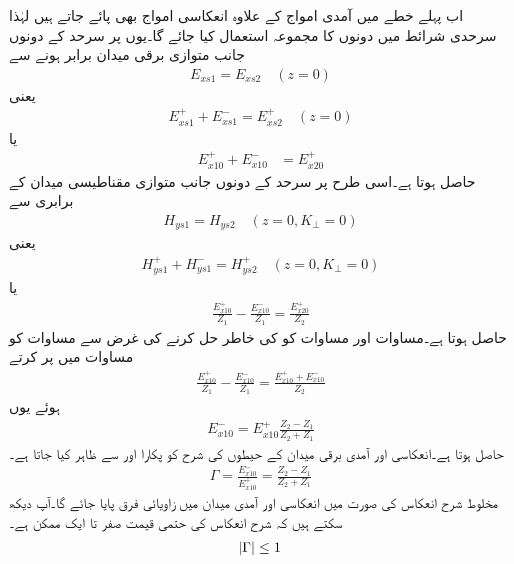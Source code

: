 اب پہلے خطے میں آمدی امواج کے علاوہ انعکاسی امواج بھی پائے جاتے ہیں لہٰذا سرحدی شرائط میں دونوں کا مجموعہ استعمال کیا جائے گا۔یوں  پر سرحد کے دونوں جانب متوازی برقی میدان برابر  ہونے سے
\begin{align*}
E_{xs1}=E_{xs2}    \quad (z=0)
\end{align*}
یعنی
\begin{align*}
E_{xs1}^+ +E_{xs1}^-=E_{xs2}^+ \quad (z=0)
\end{align*}
یا
\begin{align}\label{مساوات_موج_برقی_شرط_پورا}
E_{x10}^+ + E_{x10}^-&=E_{x20}^+
\end{align}
حاصل ہوتا ہے۔اسی طرح   پر سرحد کے دونوں جانب متوازی مقناطیسی میدان کے برابری سے
\begin{align*}
H_{ys1}=H_{ys2} \quad (z=0, K_\perp=0)
\end{align*}
یعنی
\begin{align*}
H_{ys1}^+ +H_{ys1}^-=H_{ys2}^+ \quad (z=0, K_\perp=0)
\end{align*}
یا
\begin{align}\label{مساوات_موج_مقناطیسی_شرط_پورا}
\frac{E_{x10}^+}{Z_1}-\frac{E_{x10}^-}{Z_1}=\frac{E_{x20}^+}{Z_2}
\end{align}
حاصل ہوتا ہے۔مساوات  اور مساوات  کو  کی خاطر حل کرنے کی غرض سے مساوات  کو مساوات  میں پر کرتے
\begin{align*}
\frac{E_{x10}^+}{Z_1}-\frac{E_{x10}^-}{Z_1}=\frac{E_{x10}^+ + E_{x10}^-}{Z_2}
\end{align*}
ہوئے یوں
\begin{align*}
E_{x10}^- =E_{x10}^+ \frac{Z_2-Z_1}{Z_2+Z_1}
\end{align*}
حاصل ہوتا ہے۔انعکاسی اور آمدی برقی میدان کے حیطوں کی شرح کو  پکارا  اور  سے ظاہر کیا جاتا ہے۔
\begin{align}\label{مساوات_موج_شرح_انعکاس_تعریف}
\Gamma=\frac{E_{x10}^-}{E_{x10}^+}=\frac{Z_2-Z_1}{Z_2+Z_1}
\end{align}
مخلوط شرح انعکاس کی صورت میں انعکاسی اور آمدی میدان میں زاویائی فرق پایا جائے گا۔آپ دیکھ سکتے ہیں کہ شرح انعکاس کی حتمی قیمت صفر تا ایک ممکن ہے۔
\begin{align}
\abs{\Gamma} \le 1
\end{align}


